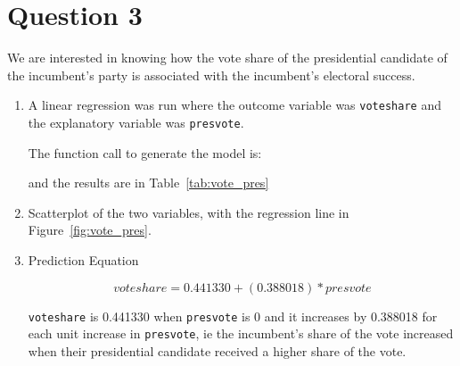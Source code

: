 \documentclass[12pt,letterpaper]{article}
\begin{document}
\section*{Question 3}

\noindent We are interested in knowing how the vote share of the presidential candidate of the incumbent's party is associated with the incumbent's electoral success.

	\begin{enumerate}
		\item A linear regression was run where the outcome variable was \texttt{voteshare} and 
		  the explanatory variable was \texttt{presvote}.

      The function call to generate the model is:
  	  
      and the results are in Table~\ref{tab:vote_pres}

		\item Scatterplot of the two variables, with the regression line in Figure~\ref{fig:vote_pres}.

		\item Prediction Equation 

     \[voteshare = 0.441330 + (0.388018) * presvote\]
     
     \texttt{voteshare} is 0.441330 when \texttt{presvote} is 0 and it increases
     by 0.388018 for each unit increase in \texttt{presvote}, ie the incumbent's share 
     of the vote increased when their presidential candidate received a higher
     share of the vote.

	\end{enumerate}
	
  
\end{document}
